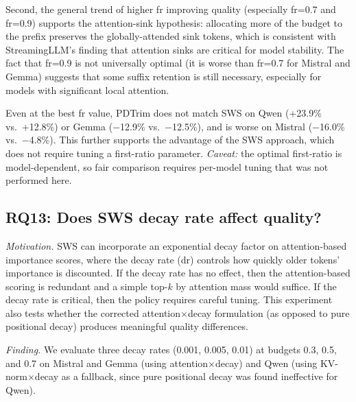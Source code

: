 \documentclass[11pt]{article}
\newcommand{\sws}{SWS}
\newcommand{\pct}{\%}
\theoremstyle{definition}
\theoremstyle{plain}
\begin{document}
Second, the general trend of higher fr improving quality (especially fr=0.7 and fr=0.9) supports the attention-sink hypothesis: allocating more of the budget to the prefix preserves the globally-attended sink tokens, which is consistent with StreamingLLM's finding that attention sinks are critical for model stability.  The fact that fr=0.9 is not universally optimal (it is worse than fr=0.7 for Mistral and Gemma) suggests that some suffix retention is still necessary, especially for models with significant local attention.

Even at the best fr value, PDTrim does not match \sws{} on Qwen (+23.9\pct{} vs.\ +12.8\pct{}) or Gemma ($-$12.9\pct{} vs.\ $-$12.5\pct{}), and is worse on Mistral ($-$16.0\pct{} vs.\ $-$4.8\pct{}).  This further supports the advantage of the \sws{} approach, which does not require tuning a first-ratio parameter.  \emph{Caveat:} the optimal first-ratio is model-dependent, so fair comparison requires per-model tuning that was not performed here.

\subsection{RQ13: Does SWS decay rate affect quality?}
\label{sec:rq13}

\emph{Motivation.}  \sws{} can incorporate an exponential decay factor on attention-based importance scores, where the decay rate (dr) controls how quickly older tokens' importance is discounted.  If the decay rate has no effect, then the attention-based scoring is redundant and a simple top-$k$ by attention mass would suffice.  If the decay rate is critical, then the policy requires careful tuning.  This experiment also tests whether the corrected attention$\times$decay formulation (as opposed to pure positional decay) produces meaningful quality differences.

\emph{Finding.}  We evaluate three decay rates (0.001, 0.005, 0.01) at budgets 0.3, 0.5, and 0.7 on Mistral and Gemma (using attention$\times$decay) and Qwen (using KV-norm$\times$decay as a fallback, since pure positional decay was found ineffective for Qwen).
\end{document}
